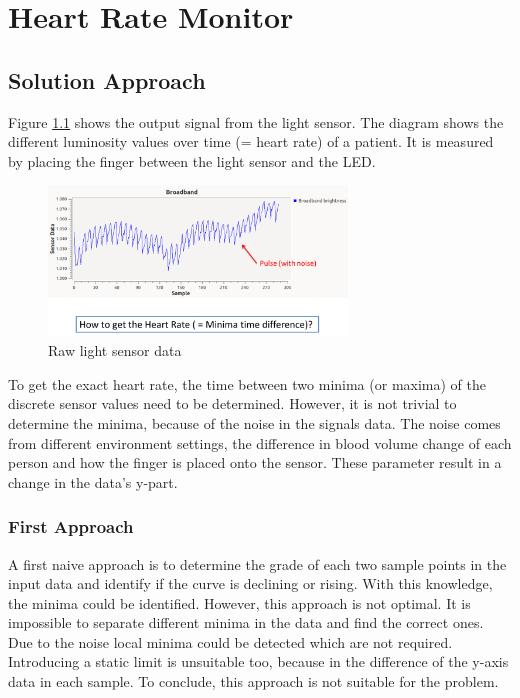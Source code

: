 \documentclass[notitlepage]{scrreprt}
\begin{document}
\chapter{Heart Rate Monitor}
\label{chap:hrm}
\section{Solution Approach}
Figure \ref{fig:raw-data} shows the output signal from the light sensor. The diagram shows the different luminosity values over time (= heart rate) of a patient. It is measured by placing the finger between the light sensor and the LED.

\begin{figure}[H]
	\centering
	\includegraphics[width=300px]{images/rawData.png}
	\caption{Raw light sensor data}
	\label{fig:raw-data}
\end{figure}

To get the exact heart rate, the time between two minima (or maxima) of the discrete sensor values need to be determined. However, it is not trivial to determine the minima, because of the noise in the signals data. The noise comes from different environment settings, the difference in blood volume change of each person and how the finger is placed onto the sensor. These parameter result in a change in the data's y-part.

\subsection{First Approach}
A first naive approach is to determine the grade of each two sample points in the input data and identify if the curve is declining or rising. With this knowledge, the minima could be identified. However, this approach is not optimal. It is impossible to separate different minima in the data and find the correct ones. Due to the noise local minima could be detected which are not required. Introducing a static limit is unsuitable too, because in the difference of the y-axis data in each sample. To conclude, this approach is not suitable for the problem.
\end{document}
